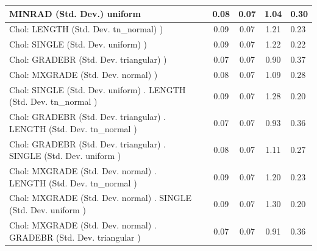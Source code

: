 \begin{table}
\begin{center}
\begin{tabular}{|l|l|c|c|c|l|}
			\hline
			MINRAD (Std. Dev.) uniform &  & 0.08 & 0.07 & 1.04 & 0.30 \\
			\hline
			 Chol: LENGTH (Std. Dev. tn_normal) ) &  & 0.09 & 0.07 & 1.21 & 0.23 \\
			\hline
			 Chol: SINGLE (Std. Dev. uniform) ) &  & 0.09 & 0.07 & 1.22 & 0.22 \\
			\hline
			 Chol: GRADEBR (Std. Dev. triangular) ) &  & 0.07 & 0.07 & 0.90 & 0.37 \\
			\hline
			 Chol: MXGRADE (Std. Dev. normal) ) &  & 0.08 & 0.07 & 1.09 & 0.28 \\
			\hline
			 Chol: SINGLE (Std. Dev. uniform) . LENGTH (Std. Dev.   tn_normal ) &  & 0.09 & 0.07 & 1.28 & 0.20 \\
			\hline
			 Chol: GRADEBR (Std. Dev. triangular) . LENGTH (Std. Dev.   tn_normal ) &  & 0.07 & 0.07 & 0.93 & 0.36 \\
			\hline
			 Chol: GRADEBR (Std. Dev. triangular) . SINGLE (Std. Dev.   uniform ) &  & 0.08 & 0.07 & 1.11 & 0.27 \\
			\hline
			 Chol: MXGRADE (Std. Dev. normal) . LENGTH (Std. Dev.   tn_normal ) &  & 0.09 & 0.07 & 1.20 & 0.23 \\
			\hline
			 Chol: MXGRADE (Std. Dev. normal) . SINGLE (Std. Dev.   uniform ) &  & 0.09 & 0.07 & 1.30 & 0.20 \\
			\hline
			 Chol: MXGRADE (Std. Dev. normal) . GRADEBR (Std. Dev.   triangular ) &  & 0.07 & 0.07 & 0.91 & 0.36 \\
			\hline
		\end{tabular}
	\end{center}
\end{table}
